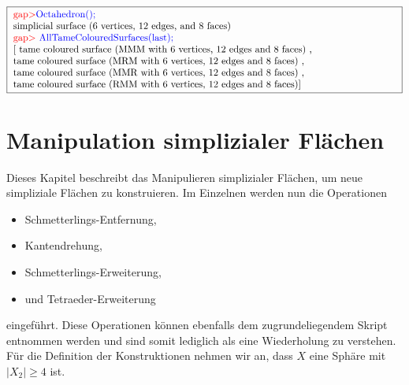 \documentclass[12pt,titlepage,twoside,cleardoublepage]{article}
\theoremstyle{nummermitklammern}
\numberwithin{equation}{section}
\begin{document}
\begin{center}
$\fbox{
\parbox{14cm}{
\textcolor{red}{gap$>$}\textcolor{blue}{Octahedron();}\newline
simplicial surface (6 vertices, 12 edges, and 8 faces)\newline
\textcolor{red}{gap$>$} \textcolor{blue}{AllTameColouredSurfaces(last);}\newline
[ tame coloured surface (MMM with 6 vertices, 12 edges and 8 faces)
    , \newline
     tame coloured surface (MRM with 6 vertices, 12 edges and 8 faces)
    ,\newline
     tame coloured surface (MMR with 6 vertices, 12 edges and 8 faces)
    ,\newline
  tame coloured surface (RMM with 6 vertices, 12 edges and 8 faces)]
}}
$
\end{center}
\section{Manipulation simplizialer Flächen}\label{manipulation}
Dieses Kapitel beschreibt das Manipulieren simplizialer Flächen, um neue simpliziale Flächen zu konstruieren. Im Einzelnen werden nun die Operationen
\begin{itemize}
\item Schmetterlings-Entfernung,
\item Kantendrehung,
 \item Schmetterlings-Erweiterung,
 \item und Tetraeder-Erweiterung
\end{itemize}
 eingeführt.
Diese Operationen können ebenfalls dem zugrundeliegendem Skript entnommen werden und sind somit lediglich als eine Wiederholung zu verstehen. Für die Definition der Konstruktionen nehmen wir an, dass $X$ eine Sphäre mit $\vert X_2 \vert \geq 4$ ist.

\end{document}
